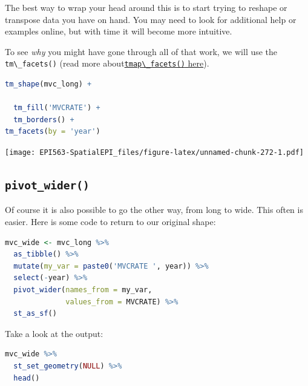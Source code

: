 \documentclass[
]{book}
\newcommand{\passthrough}[1]{#1}
\begin{document}
The best way to wrap your head around this is to start trying to reshape or transpose data you have on hand. You may need to look for additional help or examples online, but with time it will become more intuitive.

To see \emph{why} you might have gone through all of that work, we will use the \passthrough{\lstinline!tm\_facets()!} (read more about\protect\hyperlink{tmap-facet}{\passthrough{\lstinline!tmap\_facets()!} here}).

\begin{lstlisting}[language=R]
tm_shape(mvc_long) +
  
  tm_fill('MVCRATE') + 
  tm_borders() +
tm_facets(by = 'year')
\end{lstlisting}

\texttt{[image: EPI563-SpatialEPI\_files/figure-latex/unnamed-chunk-272-1.pdf]}

\hypertarget{pivot_wider}{%
\subsection{\texorpdfstring{\texttt{pivot\_wider()}}{pivot\_wider()}}\label{pivot_wider}}

Of course it is also possible to go the other way, from long to wide. This often is easier. Here is some code to return to our original shape:

\begin{lstlisting}[language=R]
mvc_wide <- mvc_long %>%
  as_tibble() %>%
  mutate(my_var = paste0('MVCRATE ', year)) %>%
  select(-year) %>%
  pivot_wider(names_from = my_var,
              values_from = MVCRATE) %>%
  st_as_sf()
\end{lstlisting}

Take a look at the output:

\begin{lstlisting}[language=R]
mvc_wide %>%
  st_set_geometry(NULL) %>%
  head()
\end{lstlisting}

 
  \providecommand{\huxb}[2]{\arrayrulecolor[RGB]{#1}\global\arrayrulewidth=#2pt}
  \providecommand{\huxvb}[2]{\color[RGB]{#1}\vrule width #2pt}
  \providecommand{\huxtpad}[1]{\rule{0pt}{#1}}
  \providecommand{\huxbpad}[1]{\rule[-#1]{0pt}{#1}}
\end{document}
